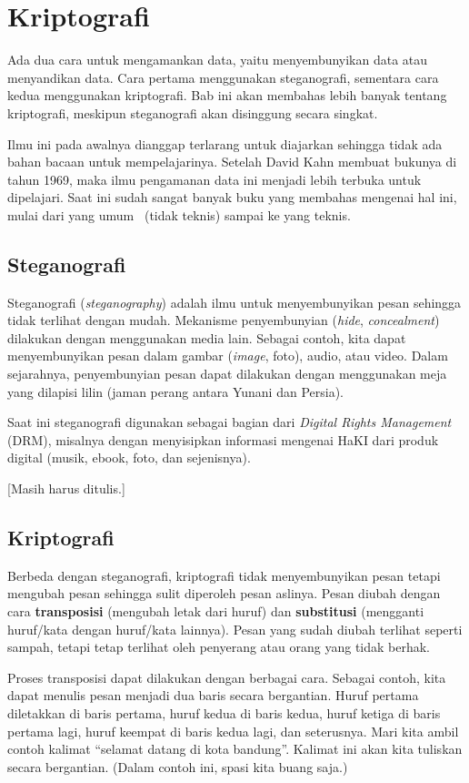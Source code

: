 \chapter{Kriptografi}
Ada dua cara untuk mengamankan data, yaitu menyembunyikan data atau menyandikan
data. Cara pertama menggunakan steganografi, sementara cara kedua menggunakan
kriptografi. Bab ini akan membahas lebih banyak tentang kriptografi, meskipun
steganografi akan disinggung secara singkat.

Ilmu ini pada awalnya dianggap terlarang untuk diajarkan sehingga tidak ada
bahan bacaan untuk mempelajarinya. Setelah David Kahn membuat bukunya di tahun
1969, maka ilmu pengamanan data ini menjadi lebih terbuka untuk dipelajari.
Saat ini sudah sangat banyak buku yang membahas mengenai hal ini, mulai dari
yang umum~\cite{levycrypto} (tidak teknis) sampai ke yang teknis.


\section{Steganografi}
Steganografi ({\em steganography}) adalah ilmu untuk menyembunyikan pesan
sehingga tidak terlihat dengan mudah. Mekanisme penyembunyian ({\em hide}, {\em
concealment}) dilakukan dengan menggunakan media lain. Sebagai contoh, kita
dapat menyembunyikan pesan dalam gambar ({\em image}, foto), audio, atau video.
Dalam sejarahnya, penyembunyian pesan dapat dilakukan dengan menggunakan meja
yang dilapisi lilin (jaman perang antara Yunani dan Persia).

Saat ini steganografi digunakan sebagai bagian dari {\em Digital Rights
Management} (DRM), misalnya dengan menyisipkan informasi mengenai HaKI dari
produk digital (musik, ebook, foto, dan sejenisnya).

[Masih harus ditulis.]



\section{Kriptografi}
Berbeda dengan steganografi, kriptografi tidak menyembunyikan pesan tetapi
mengubah pesan sehingga sulit diperoleh pesan aslinya. Pesan diubah dengan cara
{\bf transposisi} (mengubah letak dari huruf) dan {\bf substitusi} (mengganti
huruf/kata dengan huruf/kata lainnya). Pesan yang sudah diubah terlihat seperti
sampah, tetapi tetap terlihat oleh penyerang atau orang yang tidak berhak.

Proses transposisi dapat dilakukan dengan berbagai cara. Sebagai contoh, kita
dapat menulis pesan menjadi dua baris secara bergantian. Huruf pertama
diletakkan di baris pertama, huruf kedua di baris kedua, huruf ketiga di baris
pertama lagi, huruf keempat di baris kedua lagi, dan seterusnya. Mari kita
ambil contoh kalimat ``selamat datang di kota bandung''. Kalimat ini akan kita
tuliskan secara bergantian. (Dalam contoh ini, spasi kita buang saja.)

